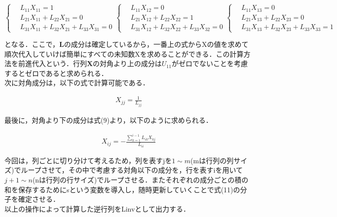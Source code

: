 \documentclass[dvipdfmx]{jsarticle}
\begin{document}
\begin{equation}
    \left\{ \,
        \begin{aligned}
            & L_{11}X_{11}=1 \\
            & L_{21}X_{11}+L_{22}X_{21}=0 \\
            & L_{31}X_{11}+L_{32}X_{21}+L_{33}X_{31}=0
        \end{aligned}
    \right.
    \left\{ \,
        \begin{aligned}
            & L_{11}X_{12}=0 \\
            & L_{21}X_{12}+L_{22}X_{22}=1 \\
            & L_{31}X_{12}+L_{32}X_{22}+L_{33}X_{32}=0
        \end{aligned}
    \right.
    \left\{ \,
        \begin{aligned}
            & L_{11}X_{13}=0 \\
            & L_{21}X_{13}+L_{22}X_{23}=0 \\
            & L_{31}X_{13}+L_{32}X_{23}+L_{33}X_{33}=1
        \end{aligned}
    \right.
\end{equation}

となる．ここで，$\boldsymbol{L}$の成分は確定しているから，一番上の式からXの値を求めて順次代入していけば簡単にすべての未知数Xを求めることができる．この計算方法を前進代入という．行列$\boldsymbol{X}$の対角より上の成分は$U_{11}$がゼロでないことを考慮するとゼロであると求められる．\\

次に対角成分は，以下の式で計算可能である．

\begin{align}
    X_{jj}=\frac{1}{L_{jj}}
\end{align}

最後に，対角より下の成分は式(9)より，以下のように求められる．

\begin{align}
    X_{ij}=-\frac{\sum_{k=1}^{i-1}L_{ik}X_{kj}}{L_{ii}}
\end{align}

今回は，列ごとに切り分けて考えるため，列を表すjを$1 \sim m$(mは行列の列サイズ)でループさせて，その中で考慮する対角以下の成分を，行を表すiを用いて$j+1 \sim n$(nは行列の行サイズ)でループさせる．またそれぞれの成分ごとの積の和を保存するためにsという変数を導入し，随時更新していくことで式(11)の分子を確定させる．\\
以上の操作によって計算した逆行列をLinvとして出力する．\\
\end{document}
